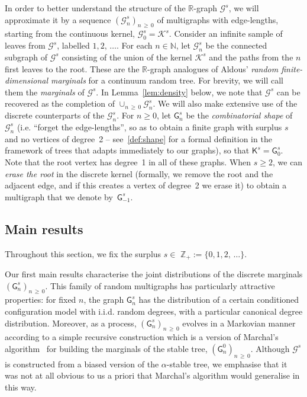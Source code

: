 \documentclass[AHL,Unicode,longabstracts,published]{cedram}
\newcommand{\cG}{\mathcal{G}}
\newcommand{\cK}{\mathcal{K}}
\newcommand{\sG}{\mathsf{G}}
\newcommand{\sK}{\mathsf{K}}
\newcommand{\R}{\mathbb{R}}
\newcommand{\Z}{\mathbb{Z}}
\newcommand{\N}{\mathbb{N}}
\newcommand{\R}{\mathbb{R}}
\begin{document}
In order to better understand the structure of the $\R$-graph $\cG^s$, we will approximate it by a sequence $(\cG^s_n)_{n\,\ge\,0}$ of multigraphs with edge-lengths, starting from the continuous kernel, $\cG_{0}^s=\cK^s$. Consider an infinite sample of leaves from $\cG^s$, labelled $1,2,\,\ldots$. For each $n \in \N$, let $\cG_{n}^s$ be the connected subgraph of $\cG^s$ consisting of the union of the kernel $\cK^s$ and the paths from the $n$ first leaves to the root. These are the $\R$-graph analogues of Aldous' \emph{random finite-dimensional marginals} for a continuum random tree. For brevity, we will call them the \emph{marginals} of $\cG^s$. In Lemma~\ref{lem:density} below, we note that $\cG^s$ can be recovered as the completion of $\cup_{n\,\geq\,0} \cG_{n}^s$. We will also make extensive use of the discrete counterparts of the $\cG_n^s$. For $n\geq 0$, let $\sG_{n}^s$ be the \emph{combinatorial shape} of $\cG_{n}^s$ (i.e. ``forget the edge-lengths'', so as to obtain a finite graph with surplus $s$ and no vertices of degree~2 -- see~\eqref{def:shape} for a formal definition in the framework of trees that adapts immediately to our graphs), so that $\sK^s=\sG_{0}^s$. Note that the root vertex has degree~1 in all of these graphs. When $s\geq 2$, we can \emph{erase the root} in the discrete kernel (formally, we remove the root and the adjacent edge, and if this creates a vertex of degree~2 we erase it) to obtain a multigraph that we denote by~$\sG_{-1}^{s}$.


\subsection{Main results}\label{sec:mainresults}

Throughout this section, we fix the surplus $s \in$ $\Z_+ := \{0,1,2,\,\ldots\}$.

Our first main results characterise the joint distributions of the discrete marginals $(\sG_n^s)_{n \,\ge\,0}$. This family of random multigraphs has particularly attractive properties: for fixed $n$, the graph $\sG_n^s$ has the distribution of a certain conditioned configuration model with i.i.d. random degrees, with a particular canonical degree distribution. Moreover, as a process, $(\sG_n^s)_{n \,\ge\,0}$ evolves in a Markovian manner according to a simple recursive construction which is a version of Marchal's algorithm~\cite{Marchal} for building the marginals of the stable tree, $(\sG_n^0)_{n\,\ge\,0}$. Although $\cG^s$ is constructed from a biased version of the $\alpha$-stable tree, we emphasise that it was not at all obvious to us a priori that Marchal's algorithm would generalise in this way.
\end{document}
